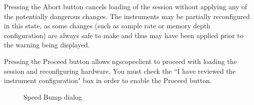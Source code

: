 Pressing the Abort button cancels loading of the session without applying any of the potentially dangerous changes.
The instruments may be partially reconfigured in this state, as some changes (such as sample rate or memory depth
configuration) are always safe to make and thus may have been applied prior to the warning being displayed.

Pressing the Proceed button allows ngscopeclient to proceed with loading the session and reconfiguring hardware. You
must check the ``I have reviewed the instrument configuration" box in order to enable the Proceed button.

\begin{figure}[H]
\centering
{}
\caption{Speed Bump dialog}
\label{speedbump}
\end{figure}

